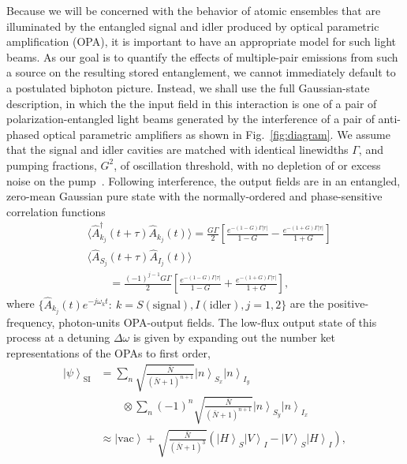 \documentclass[aps,twocolumn,secnumarabic,amsmath,amssymb,pra,groupedaddress,
showpacs, showkeys]{revtex4-1}
\newcommand{\ket}[1]{\left|#1\right\rangle}
\newcommand{\pna}[1]{\left(#1\right)}
\newcommand{\pnb}[1]{\left[#1\right]}
\newcommand{\abs}[1]{\left|#1\right|}
\begin{document}
Because we will be concerned with the behavior of atomic ensembles that are
illuminated by the entangled signal and idler produced by optical parametric
amplification (OPA), it is important to have an appropriate model for such
light beams. As our goal is to quantify the effects of multiple-pair emissions
from such a source on the resulting stored entanglement, we cannot immediately
default to a postulated biphoton picture. Instead, we shall use the full
Gaussian-state description, in which the the input field in this interaction is
one of a pair of polarization-entangled light beams generated by the
interference of a pair of anti-phased optical parametric amplifiers as shown in
Fig.~\ref{fig:diagram}. We assume that the signal and idler cavities are
matched with identical linewidths $\Gamma$, and pumping fractions, $G^2$, of
oscillation threshold, with no depletion of or excess noise on the
pump~\cite{1367-2630-4-1-347, 1464-4266-2-1-101}. Following interference, the
output fields are in an entangled, zero-mean Gaussian pure state with the
normally-ordered and phase-sensitive correlation functions
\begin{align}
&\langle \hat{A}^{\dagger}_{k_j}\pna{t+\tau} \hat{A}_{k_j}\pna{t}\rangle = \frac{G \Gamma}{2} 
\pnb{\frac{e^{-\pna{1-G}\Gamma \abs{\tau}}}{1-G}-\frac{e^{-\pna{1+G}\Gamma \abs{\tau}}}{1+G}}\nonumber \\
&\langle \hat{A}_{S_j}\pna{t+\tau} \hat{A}_{I_j}\pna{t}\rangle \nonumber \\ 
& \qquad =\frac{\pna{-1}^{j-1}G \Gamma}{2} 
\pnb{\frac{e^{-\pna{1-G}\Gamma \abs{\tau}}}{1-G}+\frac{e^{-\pna{1+G}\Gamma \abs{\tau}}}{1+G}},	
\end{align}
where $\{\hat{A}_{k_j}\pna{t}e^{-j\omega_k
  t}:~k=S\pna{\textrm{signal}},I\pna{\textrm{idler}},j=1,2\}$ are the positive-frequency, photon-units OPA-output fields. The low-flux output state
of this process at a detuning $\Delta \omega$ is given by expanding out the
number ket representations of the OPAs to first order,
\begin{align}
\ket{\psi}_{\textrm{SI}} & = \sum_n
\sqrt{\frac{\bar{N}}{\pna{\bar{N}+1}^{n+1}}} \ket{n}_{S_x}\ket{n}_{I_y}
\nonumber \\ & \qquad \otimes \sum_n \pna{-1}^n \sqrt{\frac{\bar{N}}{\pna{\bar{N}+1}^{n+1}}} \ket{n}_{S_y}\ket{n}_{I_x} \nonumber \\
& \approx \ket{\textrm{vac}}+\sqrt{\frac{\bar{N}}{\pna{\bar{N}+1}^{3}}}\pna{\ket{H}_S\ket{V}_I-\ket{V}_S\ket{H}_I},\label{eq:final_singlet}
\end{align}
\end{document}
